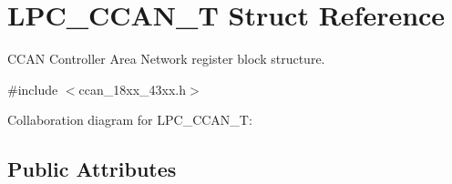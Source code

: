 \hypertarget{struct_l_p_c___c_c_a_n___t}{}\section{L\+P\+C\+\_\+\+C\+C\+A\+N\+\_\+T Struct Reference}
\label{struct_l_p_c___c_c_a_n___t}


C\+C\+AN Controller Area Network register block structure.  




{\ttfamily \#include $<$ccan\+\_\+18xx\+\_\+43xx.\+h$>$}



Collaboration diagram for L\+P\+C\+\_\+\+C\+C\+A\+N\+\_\+T\+:
\subsection*{Public Attributes}
